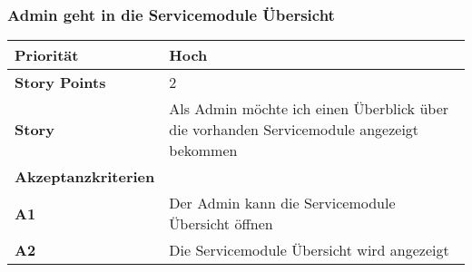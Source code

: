  \subsubsection{Admin geht in die Servicemodule Übersicht}

 \begin{tabularx}{\linewidth}{l X}
\textbf{Priorität} & Hoch\\
 \hline
 \textbf{Story Points} & 2\\
 \hline
 \textbf{Story}& Als Admin möchte ich einen Überblick über die vorhanden Servicemodule angezeigt bekommen\\
 \hline
 \textbf{Akzeptanzkriterien} & \\
 \hline
  \textbf{A1} & Der Admin kann die Servicemodule Übersicht öffnen\\
 \hline
\textbf{A2} & Die Servicemodule Übersicht wird angezeigt\\
  \hline
 \end{tabularx}